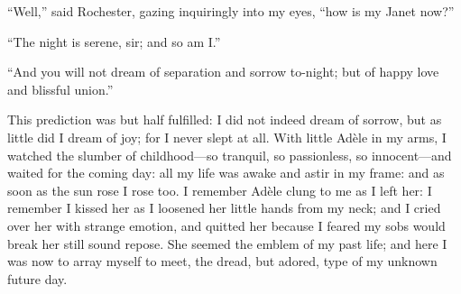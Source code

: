 \enquote{Well,} said \Mr{} Rochester, gazing inquiringly into my eyes,
\enquote{how is my Janet now?}

\enquote{The night is serene, sir; and so am I\@.}

\enquote{And you will not dream of separation and sorrow to-night; but
of happy love and blissful union.}

This prediction was but half fulfilled: I did not indeed dream of
sorrow, but as little did I dream of joy; for I never slept at all. 
With little Adèle in my arms, I watched the slumber of childhood---so
tranquil, so passionless, so innocent---and waited for the coming day:
all my life was awake and astir in my frame: and as soon as the sun rose
I rose too.  I remember Adèle clung to me as I left her: I remember I
kissed her as I loosened her little hands from my neck; and I cried over
her with strange emotion, and quitted her because I feared my sobs would
break her still sound repose.  She seemed the emblem of my past life;
and here I was now to array myself to meet, the dread, but adored, type
of my unknown future day.
